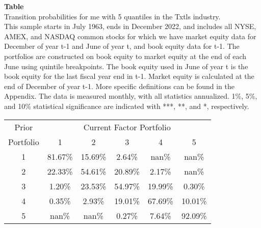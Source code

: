 \begin{table*}[ht!]
\raggedright
{}
\label{tab: transition_probs_me_Txtls_with_5_quantiles}
\textbf{Table \thetable} \\
Transition probabilities for me with 5 quantiles in the Txtls industry. \\
\hspace*{1em}This sample starts in July 1963, ends in December 2022, and includes all NYSE, AMEX, and NASDAQ common stocks for which we have market equity data for December of year t-1 and June of year t, and book equity data for t-1. The portfolios are constructed on book equity to market equity at the end of each June using quintile breakpoints.  The book equity used in June of year t is the book equity for the last fiscal year end in t-1.  Market equity is calculated at the end of December of year t-1.  More specific definitions can be found in the Appendix.  The data is measured monthly, with all statistics annualized.  1\%, 5\%, and 10\% statistical significance are indicated with ***, **, and *, respectively. \\
\vspace{0.5em}
\centering
\begin{adjustbox}{max width=\textwidth}
\begin{tabular}{@{}cccccc@{}}
\toprule
Prior & \multicolumn{5}{c}{Current Factor Portfolio} \\
Portfolio & 1 & 2 & 3 & 4 & 5 \\
\midrule
1 & 81.67\% & 15.69\% & 2.64\% & nan\% & nan\% \\
2 & 22.33\% & 54.61\% & 20.89\% & 2.17\% & nan\% \\
3 & 1.20\% & 23.53\% & 54.97\% & 19.99\% & 0.30\% \\
4 & 0.35\% & 2.93\% & 19.01\% & 67.69\% & 10.01\% \\
5 & nan\% & nan\% & 0.27\% & 7.64\% & 92.09\% \\
\bottomrule
\end{tabular}
\end{adjustbox}
\end{table*}